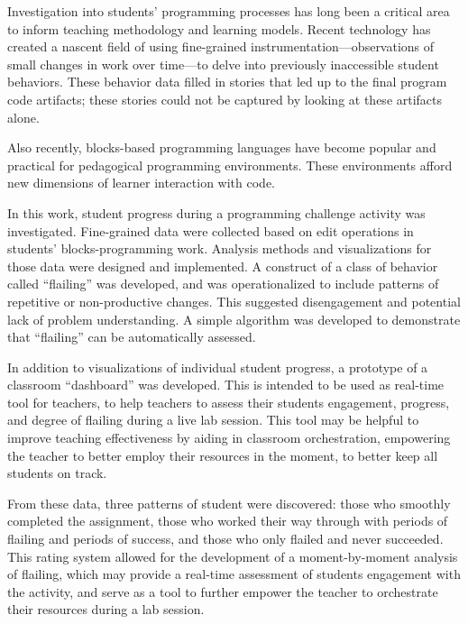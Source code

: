 

Investigation into students' programming processes has long been a critical area to inform teaching methodology and learning models. Recent technology has created a nascent field of using fine-grained instrumentation---observations of small changes in work over time---to delve into previously inaccessible student behaviors. These behavior data filled in stories that led up to the final program code artifacts; these stories could not be captured by looking at these artifacts alone. 

Also recently, blocks-based programming languages have become popular and practical for pedagogical programming environments. These environments afford new dimensions of learner interaction with code. 

In this work, student progress during a programming challenge activity was investigated. Fine-grained data were collected based on edit operations in students' blocks-programming work. Analysis methods and visualizations for those data were designed and implemented. A construct of a class of behavior called ``flailing'' was developed, and was operationalized to include patterns of repetitive or non-productive changes. This suggested disengagement and potential lack of problem understanding. A simple algorithm was developed to demonstrate that ``flailing'' can be automatically assessed.

In addition to visualizations of individual student progress, a prototype of a classroom ``dashboard'' was developed. This is intended to be used as real-time tool for teachers, to help teachers to assess their students engagement, progress, and degree of flailing during a live lab session. This tool may be helpful to improve teaching effectiveness by aiding in classroom orchestration, empowering the teacher to better employ their resources in the moment, to better keep all students on track.

From these data, three patterns of student were discovered: those who smoothly completed the assignment, those who worked their way through with periods of flailing and periods of success, and those who only flailed and never succeeded. This rating system allowed for the development of a moment-by-moment analysis of flailing, which may provide a real-time assessment of students engagement with the activity, and serve as a tool to further empower the teacher to orchestrate their resources during a lab session.
